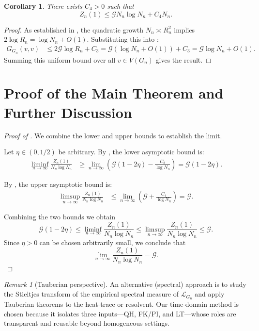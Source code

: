 \documentclass[reqno]{amsart}
\numberwithin{equation}{section}
\newtheorem{corollary}[corollary]{Corollary}
\theoremstyle{definition}
\theoremstyle{remark}
\newtheorem{remark}[remark]{Remark}
\newcommand{\cG}{\mathcal{G}}
\newcommand{\LL}{\mathcal{L}}
\begin{document}
\begin{corollary}\label{cor:upper}
There exists $C_4 > 0$ such that
\[
Z_n(1) \leq \cG N_n \log N_n + C_4 N_n.
\]
\end{corollary}

\begin{proof}
As established in , the quadratic growth $N_n \asymp R_n^2$ implies $2\log R_n = \log N_n + O(1)$. Substituting this into :
\begin{align*}
G_{G_n}(v,v) &\leq 2\cG \log R_n + C_3 = \cG (\log N_n + O(1)) + C_3 = \cG \log N_n + O(1).
\end{align*}
Summing this uniform bound over all $v \in V(G_n)$ gives the result.
\end{proof}

\section{Proof of the Main Theorem and Further Discussion}\label{sec:discussion}

\begin{proof}[Proof of ]
We combine the lower and upper bounds to establish the limit.


Let $\eta \in (0,1/2)$ be arbitrary. By , the lower asymptotic bound is:
\begin{align*}
\liminf_{n \to \infty} \frac{Z_n(1)}{N_n \log N_n} &\geq \lim_{n \to \infty} \left( \cG(1-2\eta) - \frac{C_2}{\log N_n} \right) = \cG(1-2\eta).
\end{align*}

By , the upper asymptotic bound is:
\begin{align*}
\limsup_{n \to \infty} \frac{Z_n(1)}{N_n \log N_n} &\leq \lim_{n \to \infty} \left( \cG + \frac{C_4}{\log N_n} \right) = \cG.
\end{align*}

Combining the two bounds we obtain
\[
\cG(1-2\eta) \leq \liminf_{n \to \infty} \frac{Z_n(1)}{N_n \log N_n} \leq \limsup_{n \to \infty} \frac{Z_n(1)}{N_n \log N_n} \leq \cG.
\]
Since $\eta > 0$ can be chosen arbitrarily small, we conclude that
\[
\lim_{n \to \infty} \frac{Z_n(1)}{N_n \log N_n} = \cG.
\]
\end{proof}

\begin{remark}[Tauberian perspective]
An alternative (spectral) approach is to study the Stieltjes transform of the empirical spectral measure of $\LL_{G_n}$ and apply Tauberian theorems to the heat-trace or resolvent. Our time-domain method is chosen because it isolates three inputs---QH, FK/PI, and LT---whose roles are transparent and reusable beyond homogeneous settings.
\end{remark}
\end{document}
